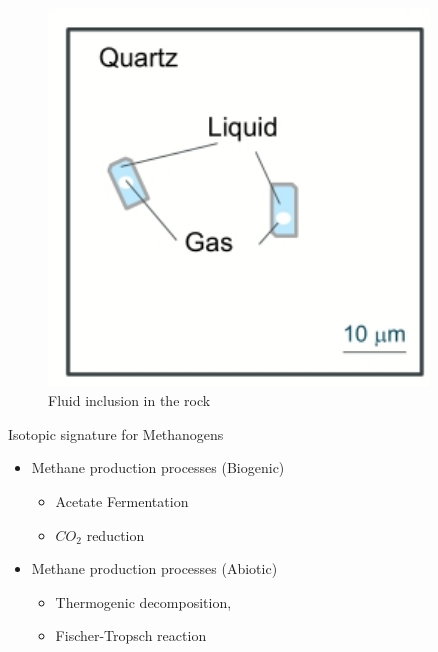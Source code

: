 \documentclass[]{article}
\begin{document}
\begin{figure}[H]
	\caption{Fluid inclusion in the rock}\label{fig:FluidInclusionInTheRock}
	\includegraphics[width=0.9\textwidth]{FluidInclusionInTheRock}
\end{figure}

Isotopic signature for Methanogens
\begin{itemize}
	\item Methane production processes (Biogenic)
	\begin{itemize}
		\item 	Acetate Fermentation
		\item $CO_2$ reduction
	\end{itemize}
	\item Methane production processes (Abiotic)
	\begin{itemize}
		\item Thermogenic decomposition,
		\item Fischer-Tropsch reaction
	\end{itemize}
\end{itemize}
\end{document}
